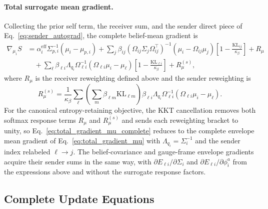 \documentclass[11pt]{article}
\begin{document}
\paragraph{Total surrogate mean gradient.}
Collecting the prior self term, the receiver sum, and the sender direct piece of Eq.~\eqref{eq:sender_autograd}, the complete belief-mean gradient is
\begin{equation}
\boxed{
\begin{aligned}
\nabla_{\mu_i} S &= \alpha_i^{\mathrm{eff}}\Sigma_{p,i}^{-1}(\mu_i - \mu_{p,i}) + \sum_j \beta_{ij}(\Omega_{ij}\Sigma_j\Omega_{ij}^{\top})^{-1}(\mu_i - \Omega_{ij}\mu_j)\left[1 - \frac{\mathrm{KL}_{ij}}{\kappa_\beta}\right] + R_\mu \\
&\quad + \sum_\ell \beta_{\ell i}\Lambda_{q_i}\Omega_{\ell i}^{-1}\left(\Omega_{\ell i}\mu_i - \mu_\ell\right)\left[1 - \frac{\mathrm{KL}_{\ell i}}{\kappa_\beta}\right] + R_\mu^{(s)},
\end{aligned}}
\label{eq:total_gradient_mu_complete}
\end{equation}
where $R_\mu$ is the receiver reweighting defined above and the sender reweighting is
\begin{equation}
R_\mu^{(s)} = \frac{1}{\kappa_\beta}\sum_\ell \left(\sum_m \beta_{\ell m}\mathrm{KL}_{\ell m}\right)\beta_{\ell i}\Lambda_{q_i}\Omega_{\ell i}^{-1}\left(\Omega_{\ell i}\mu_i - \mu_\ell\right).
\end{equation}
For the canonical entropy-retaining objective, the KKT cancellation removes both softmax response terms $R_\mu$ and $R_\mu^{(s)}$ and sends each reweighting bracket to unity, so Eq.~\eqref{eq:total_gradient_mu_complete} reduces to the complete envelope mean gradient of Eq.~\eqref{eq:total_gradient_mu} with $\Lambda_{q_i} = \Sigma_i^{-1}$ and the sender index relabeled $\ell \to j$. The belief-covariance and gauge-frame envelope gradients acquire their sender sums in the same way, with $\partial E_{\ell i}/\partial \Sigma_i$ and $\partial E_{\ell i}/\partial \phi_i^a$ from the expressions above and without the surrogate response factors.

\subsection*{Complete Update Equations}
\end{document}
